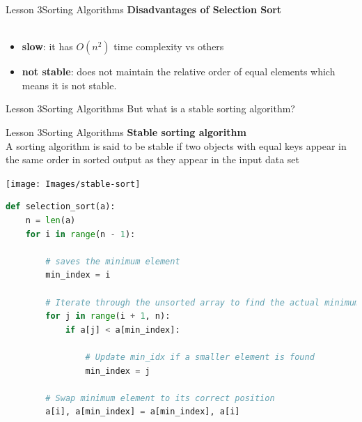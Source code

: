 \documentclass[aspectratio=1610]{beamer}
\begin{document}
\begin{frame}{Lesson 3}{Sorting Algorithms}
\LARGE
\textbf{Disadvantages of Selection Sort}\\~\\
\Large
\begin{itemize}
	\item \textbf{slow}: it has $O(n^2)$ time complexity vs others
	\item \textbf{not stable}: does not maintain the relative order of equal elements which means it is not \alert{stable}.
\end{itemize}

\end{frame}



\begin{frame}{Lesson 3}{Sorting Algorithms}
\Huge
 But what is a stable sorting algorithm?
\end{frame}



\begin{frame}{Lesson 3}{Sorting Algorithms}
\LARGE
\textbf{Stable sorting algorithm}\\
A sorting algorithm is said to be stable if two objects with equal keys appear in
the same order in sorted output as they appear in the input data set
\begin{center}
\texttt{[image: Images/stable-sort]}
\end{center}
\end{frame}



\begin{frame}[fragile]
\begin{lstlisting}[language=Python]
def selection_sort(a):
    n = len(a)
    for i in range(n - 1):
      
        # saves the minimum element
        min_index = i
        
        # Iterate through the unsorted array to find the actual minimum
        for j in range(i + 1, n):
            if a[j] < a[min_index]:
              
                # Update min_idx if a smaller element is found
                min_index = j
                      
        # Swap minimum element to its correct position
        a[i], a[min_index] = a[min_index], a[i]
\end{lstlisting}
\end{frame}
\end{document}
